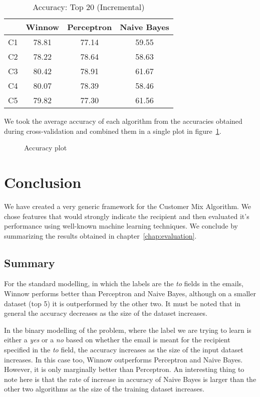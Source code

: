 \documentclass[senior,oneside]{UIUC}
\begin{document}
\begin{table}
\centering
\begin{tabular}{c | c c c}
\hline \hline
 & Winnow & Perceptron & Naive Bayes \\ [0.5ex]
\hline
C1 & 78.81 & 77.14 & 59.55  \\
C2 & 78.22 & 78.64 & 58.63  \\
C3 & 80.42 & 78.91 & 61.67  \\
C4 & 80.07 & 78.39 & 58.46  \\
C5 & 79.82 & 77.30 & 61.56  \\
\end{tabular}
\caption{Accuracy: Top 20 (Incremental)}
\label{table:incremental-top20}
\end{table}

We took the average accuracy of each algorithm from the accuracies obtained during cross-validation and combined them in a single plot in figure~\ref{fig:line-graph}.

\begin{figure}
   \center
    \caption{Accuracy plot}
    \label{fig:line-graph}
\end{figure}



\chapter{Conclusion}

We have created a very generic framework for the Customer Mix Algorithm. We chose features that would strongly indicate the recipient and then evaluated it's performance using well-known machine learning techniques. We conclude by summarizing the results obtained in chapter~\ref{chap:evaluation}.

\section{Summary}

For the standard modelling, in which the labels are the \emph{to} fields in the emails, Winnow performs better than Perceptron and Naive Bayes, although on a smaller dataset (top 5) it is outperformed by the other two. It must be noted that in general the accuracy decreases as the size of the dataset increases.

In the binary modelling of the problem, where the label we are trying to learn is either a \emph{yes} or a \emph{no} based on whether the email is meant for the recipient specified in the \emph{to} field, the accuracy increases as the size of the input dataset increases. In this case too, Winnow outperforms Perceptron and Naive Bayes. However, it is only marginally better than Perceptron. An interesting thing to note here is that the rate of increase in accuracy of Naive Bayes is larger than the other two algorithms as the size of the training dataset increases.
\end{document}
